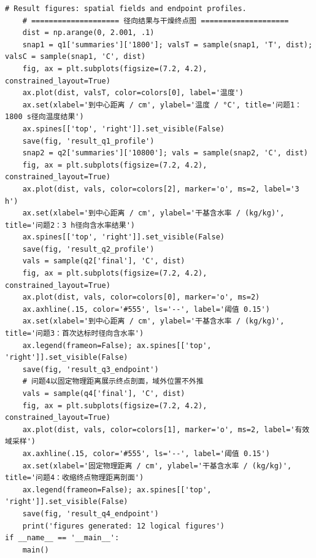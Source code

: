 \begin{Verbatim}[fontsize=\scriptsize,breaklines=true,breakanywhere=true]
    # Result figures: spatial fields and endpoint profiles.
    # ==================== 径向结果与干燥终点图 ====================
    dist = np.arange(0, 2.001, .1)
    snap1 = q1['summaries']['1800']; valsT = sample(snap1, 'T', dist); valsC = sample(snap1, 'C', dist)
    fig, ax = plt.subplots(figsize=(7.2, 4.2), constrained_layout=True)
    ax.plot(dist, valsT, color=colors[0], label='温度')
    ax.set(xlabel='到中心距离 / cm', ylabel='温度 / °C', title='问题1：1800 s径向温度结果')
    ax.spines[['top', 'right']].set_visible(False)
    save(fig, 'result_q1_profile')
    snap2 = q2['summaries']['10800']; vals = sample(snap2, 'C', dist)
    fig, ax = plt.subplots(figsize=(7.2, 4.2), constrained_layout=True)
    ax.plot(dist, vals, color=colors[2], marker='o', ms=2, label='3 h')
    ax.set(xlabel='到中心距离 / cm', ylabel='干基含水率 / (kg/kg)', title='问题2：3 h径向含水率结果')
    ax.spines[['top', 'right']].set_visible(False)
    save(fig, 'result_q2_profile')
    vals = sample(q2['final'], 'C', dist)
    fig, ax = plt.subplots(figsize=(7.2, 4.2), constrained_layout=True)
    ax.plot(dist, vals, color=colors[0], marker='o', ms=2)
    ax.axhline(.15, color='#555', ls='--', label='阈值 0.15')
    ax.set(xlabel='到中心距离 / cm', ylabel='干基含水率 / (kg/kg)', title='问题3：首次达标时径向含水率')
    ax.legend(frameon=False); ax.spines[['top', 'right']].set_visible(False)
    save(fig, 'result_q3_endpoint')
    # 问题4以固定物理距离展示终点剖面，域外位置不外推
    vals = sample(q4['final'], 'C', dist)
    fig, ax = plt.subplots(figsize=(7.2, 4.2), constrained_layout=True)
    ax.plot(dist, vals, color=colors[1], marker='o', ms=2, label='有效域采样')
    ax.axhline(.15, color='#555', ls='--', label='阈值 0.15')
    ax.set(xlabel='固定物理距离 / cm', ylabel='干基含水率 / (kg/kg)', title='问题4：收缩终点物理距离剖面')
    ax.legend(frameon=False); ax.spines[['top', 'right']].set_visible(False)
    save(fig, 'result_q4_endpoint')
    print('figures generated: 12 logical figures')
if __name__ == '__main__':
    main()
\end{Verbatim}

